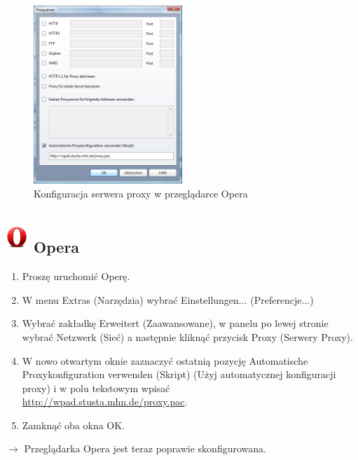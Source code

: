 \documentclass[a4paper,12pt]{scrartcl}
\begin{document}
\newpage
\begin{figure}
  \begin{center}
    \includegraphics[width=0.5\textwidth,keepaspectratio]{Bilder/Proxy_Opera}
  \end{center}
  \caption{Konfiguracja serwera proxy w przeglądarce Opera}
\end{figure}

\subsection*{\includegraphics[height=1.2cm,keepaspectratio]{Bilder/Opera_O} Opera}
\begin{enumerate}
    \item Proszę uruchomić Operę.
    \item W menu Extras (Narzędzia) wybrać Einstellungen... (Preferencje...)
    \item Wybrać zakładkę Erweitert (Zaawansowane), w panelu po lewej stronie wybrać Netzwerk (Sieć) a następnie kliknąć przycisk Proxy (Serwery Proxy).
    \item W nowo otwartym oknie zaznaczyć ostatnią pozycję Automatische Proxykonfiguration verwenden (Skript) (Użyj automatycznej konfiguracji proxy) i w polu tekstowym wpisać\\ \url{http://wpad.stusta.mhn.de/proxy.pac}.
    \item Zamknąć oba okna OK.
\end{enumerate}
$\rightarrow$ Przeglądarka Opera jest teraz poprawie skonfigurowana.
\end{document}
